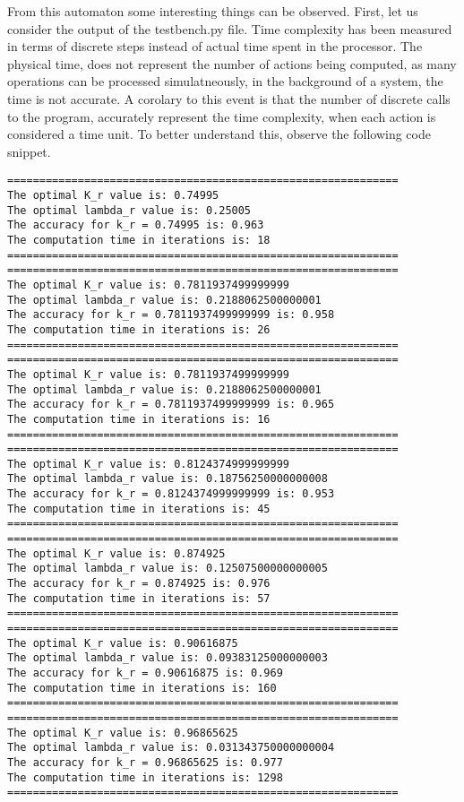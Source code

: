 \documentclass[10pt,english]{article}
\begin{document}
From this automaton some interesting things can be observed.  First, let us consider the output of the testbench.py file.  Time complexity has been measured in terms of discrete steps instead of actual time spent in the processor. The physical time, does not represent the number of actions being computed, as many operations can be processed simulatneously, in the background of a system, the time is not accurate.  A corolary to this event is that the number of discrete calls to the program, accurately represent the time complexity, when each action is considered a time unit.  To better understand this, observe the following code snippet.
\begin{lstlisting}[label={list:first},caption=State Translation in the $L_{R-I}$  automaton.] 
=============================================================
The optimal K_r value is: 0.74995
The optimal lambda_r value is: 0.25005
The accuracy for k_r = 0.74995 is: 0.963
The computation time in iterations is: 18
=============================================================
=============================================================
The optimal K_r value is: 0.7811937499999999
The optimal lambda_r value is: 0.2188062500000001
The accuracy for k_r = 0.7811937499999999 is: 0.958
The computation time in iterations is: 26
=============================================================
=============================================================
The optimal K_r value is: 0.7811937499999999
The optimal lambda_r value is: 0.2188062500000001
The accuracy for k_r = 0.7811937499999999 is: 0.965
The computation time in iterations is: 16
=============================================================
=============================================================
The optimal K_r value is: 0.8124374999999999
The optimal lambda_r value is: 0.18756250000000008
The accuracy for k_r = 0.8124374999999999 is: 0.953
The computation time in iterations is: 45
=============================================================
=============================================================
The optimal K_r value is: 0.874925
The optimal lambda_r value is: 0.12507500000000005
The accuracy for k_r = 0.874925 is: 0.976
The computation time in iterations is: 57
=============================================================
=============================================================
The optimal K_r value is: 0.90616875
The optimal lambda_r value is: 0.09383125000000003
The accuracy for k_r = 0.90616875 is: 0.969
The computation time in iterations is: 160
=============================================================
=============================================================
The optimal K_r value is: 0.96865625                                                                                                  
The optimal lambda_r value is: 0.031343750000000004                                                                                   
The accuracy for k_r = 0.96865625 is: 0.977                                                                                           
The computation time in iterations is: 1298                                                                                           
=============================================================   
\end{lstlisting}
\end{document}
